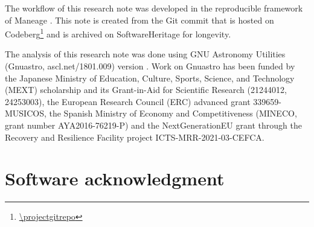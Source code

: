 \documentclass[preprint2, times, twocolappendix]{aastex702}
\begin{document}
The workflow of this research note was developed in the reproducible framework of Maneage \citep[\emph{Man}aging data lin\emph{eage},][latest Maneage commit \maneageversion{}, from \maneagedate]{maneage}.
This note is created from the Git commit {\projectversion} that is hosted on Codeberg\footnote{\url{\projectgitrepo}} and is archived on SoftwareHeritage for longevity.

The analysis of this research note was done using GNU Astronomy Utilities (Gnuastro, ascl.net/1801.009) version \gnuastroversion. Work on Gnuastro has been funded by the Japanese Ministry of Education, Culture, Sports, Science, and Technology (MEXT) scholarship and its Grant-in-Aid for Scientific Research (21244012, 24253003), the European Research Council (ERC) advanced grant 339659-MUSICOS, the Spanish Ministry of Economy and Competitiveness (MINECO, grant number AYA2016-76219-P) and the NextGenerationEU grant through the Recovery and Resilience Facility project ICTS-MRR-2021-03-CEFCA.

{}


\appendix

\section{Software acknowledgment}
\label{appendix:software}


\end{document}
